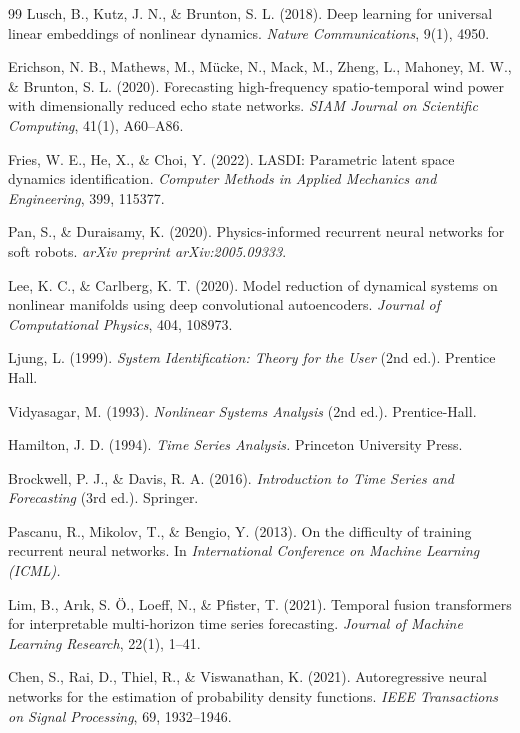\documentclass[letterpaper]{article}
\begin{document}
\begin{thebibliography}{99}
 Lusch, B., Kutz, J. N., \& Brunton, S. L. (2018). Deep learning for universal linear embeddings of nonlinear dynamics. \textit{Nature Communications}, 9(1), 4950.

 Erichson, N. B., Mathews, M., M{\"u}cke, N., Mack, M., Zheng, L., Mahoney, M. W., \& Brunton, S. L. (2020). Forecasting high-frequency spatio-temporal wind power with dimensionally reduced echo state networks. \textit{SIAM Journal on Scientific Computing}, 41(1), A60--A86.

 Fries, W. E., He, X., \& Choi, Y. (2022). LASDI: Parametric latent space dynamics identification. \textit{Computer Methods in Applied Mechanics and Engineering}, 399, 115377.

 Pan, S., \& Duraisamy, K. (2020). Physics-informed recurrent neural networks for soft robots. \textit{arXiv preprint arXiv:2005.09333}.

 Lee, K. C., \& Carlberg, K. T. (2020). Model reduction of dynamical systems on nonlinear manifolds using deep convolutional autoencoders. \textit{Journal of Computational Physics}, 404, 108973.

 Ljung, L. (1999). \textit{System Identification: Theory for the User} (2nd ed.). Prentice Hall.

 Vidyasagar, M. (1993). \textit{Nonlinear Systems Analysis} (2nd ed.). Prentice-Hall.

 Hamilton, J. D. (1994). \textit{Time Series Analysis.} Princeton University Press.

 Brockwell, P. J., \& Davis, R. A. (2016). \textit{Introduction to Time Series and Forecasting} (3rd ed.). Springer.

 Pascanu, R., Mikolov, T., \& Bengio, Y. (2013). On the difficulty of training recurrent neural networks. In \textit{International Conference on Machine Learning (ICML).}

 Lim, B., Ar{\i}k, S. {\"O}., Loeff, N., \& Pfister, T. (2021). Temporal fusion transformers for interpretable multi-horizon time series forecasting. \textit{Journal of Machine Learning Research}, 22(1), 1--41.

 Chen, S., Rai, D., Thiel, R., \& Viswanathan, K. (2021). Autoregressive neural networks for the estimation of probability density functions. \textit{IEEE Transactions on Signal Processing}, 69, 1932--1946.


\end{thebibliography}
\end{document}
